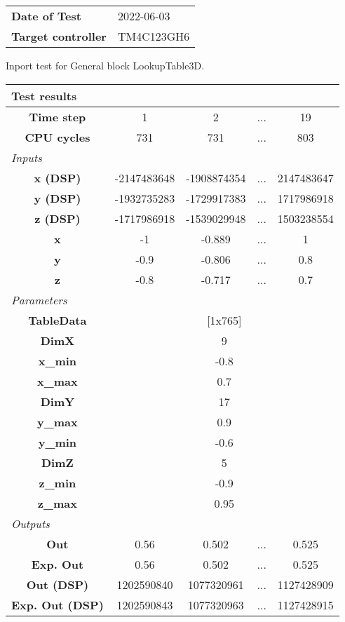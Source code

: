 \begin{tabular}{l l}
\textbf{Date of Test} & 2022-06-03 \tabularnewline
\textbf{Target controller} & TM4C123GH6 \tabularnewline
\end{tabular}
\vspace{1ex}
Inport test for General block LookupTable3D.

\vspace{1em}
\begin{tabularx}{\textwidth}{|c|c|c|>{\centering\arraybackslash}X|c|}
\hline
\multicolumn{5}{|l|}{\cellcolor[gray]{0.8}\textbf{Test results}} \tabularnewline \hline
\textbf{Time step} & 1 & 2 & ... & 19 \tabularnewline \hline
\textbf{CPU cycles} & 731 & 731 & ... & 803 \tabularnewline \hline
\multicolumn{5}{|l|}{\cellcolor[gray]{0.9}\textit{Inputs}} \tabularnewline \hline
\textbf{x (DSP)} & -2147483648 & -1908874354 & ... & 2147483647 \tabularnewline \hline
\textbf{y (DSP)} & -1932735283 & -1729917383 & ... & 1717986918 \tabularnewline \hline
\textbf{z (DSP)} & -1717986918 & -1539029948 & ... & 1503238554 \tabularnewline \hline
\textbf{x} & -1 & -0.889 & ... & 1 \tabularnewline \hline
\textbf{y} & -0.9 & -0.806 & ... & 0.8 \tabularnewline \hline
\textbf{z} & -0.8 & -0.717 & ... & 0.7 \tabularnewline \hline
\multicolumn{5}{|l|}{\cellcolor[gray]{0.9}\textit{Parameters}} \tabularnewline \hline
\textbf{TableData} & \multicolumn{4}{c|}{[1x765]} \tabularnewline \hline
\textbf{DimX} & \multicolumn{4}{c|}{9} \tabularnewline \hline
\textbf{x\_min} & \multicolumn{4}{c|}{-0.8} \tabularnewline \hline
\textbf{x\_max} & \multicolumn{4}{c|}{0.7} \tabularnewline \hline
\textbf{DimY} & \multicolumn{4}{c|}{17} \tabularnewline \hline
\textbf{y\_max} & \multicolumn{4}{c|}{0.9} \tabularnewline \hline
\textbf{y\_min} & \multicolumn{4}{c|}{-0.6} \tabularnewline \hline
\textbf{DimZ} & \multicolumn{4}{c|}{5} \tabularnewline \hline
\textbf{z\_min} & \multicolumn{4}{c|}{-0.9} \tabularnewline \hline
\textbf{z\_max} & \multicolumn{4}{c|}{0.95} \tabularnewline \hline
\multicolumn{5}{|l|}{\cellcolor[gray]{0.9}\textit{Outputs}} \tabularnewline \hline
\textbf{Out} & 0.56 & 0.502 & ... & 0.525 \tabularnewline \hline
\textbf{Exp. Out} & 0.56 & 0.502 & ... & 0.525 \tabularnewline \hline
\textbf{Out (DSP)} & 1202590840 & 1077320961 & ... & 1127428909 \tabularnewline \hline
\textbf{Exp. Out (DSP)} & 1202590843 & 1077320963 & ... & 1127428915 \tabularnewline \hline
\end{tabularx}
\vspace{1ex}

